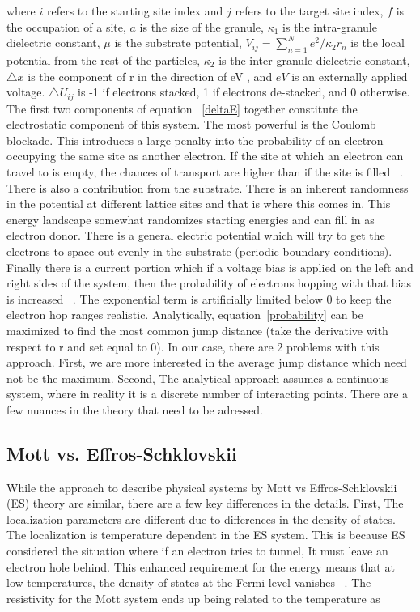 where $i$ refers to the starting site index and $j$ refers to the target site index,  $f$ is the occupation of a site, $a$ is the size of the granule, $\kappa_1$ is the intra-granule dielectric constant, $\mu$ is the substrate potential, $V_{ij} = \sum_{n=1}^{N} e^2/\kappa_2 r_{n}$ is the local potential from the rest of the particles, $\kappa_2$ is the inter-granule dielectric constant, $\triangle x$ is the component of r in the direction of eV , and $eV$ is an externally applied voltage. $\triangle U_{ij}$ is -1 if electrons stacked, 1 if electrons de-stacked, and 0 otherwise. The first two components of equation ~\ref{deltaE} together constitute the electrostatic component of this system. The most powerful is the Coulomb blockade. This introduces a large penalty into the probability of an electron occupying the same site as another electron. If the site at which an electron can travel to is empty, the chances of transport are higher than if the site is filled ~\cite{glazman05}. There is also a contribution from the substrate. There is an inherent randomness in the potential at different lattice sites and that is where this comes in. This energy landscape somewhat randomizes starting energies and can fill in as electron donor. There is a general electric potential which will try to get the electrons to space out evenly in the substrate (periodic boundary conditions). Finally there is a current portion which if a voltage bias is applied on the left and right sides of the system, then the probability of electrons hopping with that bias is increased ~\cite{aharony92}. The exponential term is artificially limited below 0 to keep the electron hop ranges realistic. Analytically, equation~\ref{probability} can be maximized to find the most common jump distance (take the derivative with respect to r and set equal to 0). In our case, there are 2 problems with this approach. First, we are more interested in the average jump distance which need not be the maximum. Second, The analytical approach assumes a continuous system, where in reality it is a discrete number of interacting points. There are a few nuances in the theory that need to be adressed.
\subsection{Mott vs. Effros-Schklovskii}
While the approach to describe physical systems by Mott vs Effros-Schklovskii (ES) theory are similar, there are a few key differences in the details. First, The localization parameters are different due to differences in the density of states. The localization is temperature dependent in the ES system. This is because ES considered the situation where if an electron tries to tunnel, It must leave an electron hole behind. This enhanced requirement for the energy means that at low temperatures, the density of states at the Fermi level vanishes ~\cite{joung}. The resistivity for the Mott system ends up being related to the temperature as

